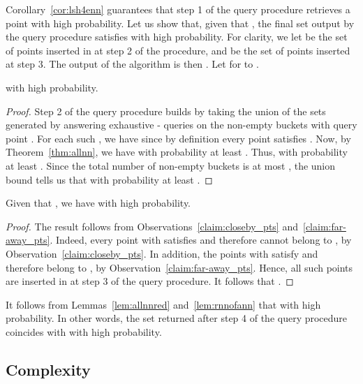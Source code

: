 Corollary~\ref{cor:lsh4enn} guarantees that step 1 of the query
procedure retrieves a point  with high
probability. Let us show that, given that , the
final set  output by the query procedure satisfies  with high
probability.  For clarity, we let  be the set of points inserted
in  at step 2 of the procedure, and  be the set of points
inserted at step 3. The output of the algorithm is then .
Let  for  to .
\begin{lem} \label{lem:allnnred}
   with high probability.
\end{lem}
\begin{proof}
  Step 2 of the query procedure builds  by taking the union of the
  sets  generated by answering exhaustive -\pleb
  queries on the non-empty buckets  with query point . For
  each such , we have  since by definition every point  satisfies . Now, by Theorem~\ref{thm:allnn}, we have  with probability at least
  .  Thus,  with
  probability at least . Since the total number of
  non-empty buckets is at most , the union bound tells us that
   with probability
  at least .
\end{proof}
\begin{lem}\label{lem:rnnofann}
  Given that , we have  with high probability.
\end{lem}
\begin{proof}
  The result follows from Observations~\ref{claim:closeby_pts}
  and~\ref{claim:far-away_pts}. Indeed, every point  with
   satisfies
   and therefore
  cannot belong to , by Observation~\ref{claim:closeby_pts}.
  In addition, the points  with  satisfy  and therefore belong to
  , by Observation~\ref{claim:far-away_pts}.
  Hence, all such points  are inserted in  at step 3 of the
  query procedure. It follows that .
\end{proof}

It follows from Lemmas~\ref{lem:allnnred} and~\ref{lem:rnnofann} that
 with high probability.  In other
words, the set  returned after step 4 of the query procedure
coincides with  with high probability.

\subsection{Complexity}
\label{rnn_complexity}


